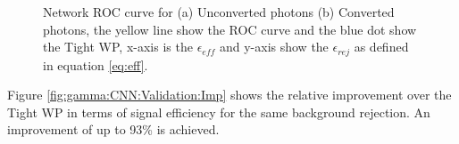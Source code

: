 \begin{figure}[htbp]
    \centering
	\begin{tcolorbox}[colback=black!5!white,colframe=white!75!black]
    \caption{Network ROC curve for (a) Unconverted photons (b) Converted photons, the yellow line show the ROC curve and the blue dot show the Tight WP, x-axis is the $\epsilon_{eff}$ and y-axis show the $\epsilon_{rej}$ as defined in equation \ref{eq:eff}.}
    \label{fig:gamma:CNN:Validation:ROC}
    \end{tcolorbox}
    
\end{figure}
Figure \ref{fig:gamma:CNN:Validation:Imp} shows the relative improvement over the Tight WP in terms of signal efficiency for the same background rejection. An improvement of up to 93\% is achieved. 
